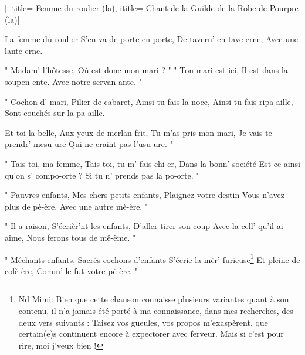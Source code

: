  [
ititle= {Femme du roulier (la)},
ititle= {Chant de la Guilde de la Robe de Pourpre (la)}]


\beginverse
La femme du roulier
S'en va de porte en porte,
De tavern' en tave-erne,
 {Avec une lante-erne.}
\endverse

\beginverse
" Madam' l'hôtesse,
Où est donc mon mari ? "
" Ton mari est ici,
Il est dans la soupen-ente.
 {Avec notre servan-ante. " }
\endverse

\beginverse
" Cochon d' mari,
Pilier de cabaret,
Ainsi tu fais la noce,
Ainsi tu fais ripa-aille,
 {Sont couchés sur la pa-aille. }
\endverse

\beginverse
Et toi la belle,
Aux yeux de merlan frit,
Tu m'as pris mon mari,
Je vais te prendr' mesu-ure
 {Qui ne craint pas l'usu-ure. " }
\endverse

\beginverse
" Tais-toi, ma femme,
Tais-toi, tu m' fais chi-er,
Dans la bonn' société
Est-ce ainsi qu'on s' compo-orte ?
 {Si tu n' prends pas la po-orte. " }
\endverse

\beginverse
" Pauvres enfants,
Mes chers petits enfants,
Plaignez votre destin
Vous n'avez plus de pè-ère,
 {Avec une autre mè-ère. " }
\endverse

\beginverse
" Il a raison,
S'écrièr'nt les enfants,
D'aller tirer son coup
Avec la cell' qu'il ai-aime,
 {Nous ferons tous de mê-ême. " }
\endverse

\beginverse
" Méchants enfants,
Sacrés cochons d'enfants
S'écrie la mèr' furieuse\footnote {Nd Mimi: Bien que cette chanson connaisse plusieurs variantes quant à son contenu, il n'a jamais été porté à ma connaissance, dans mes recherches, des deux vers suivants : Taisez vos gueules, vos propos m'exaspèrent. que certain(e)s continuent encore à expectorer avec ferveur. Mais si c'est pour rire, moi j'veux bien !}
Et pleine de colè-ère,
 {Comm' le fut votre pè-ère. " }
\endverse

\endsong